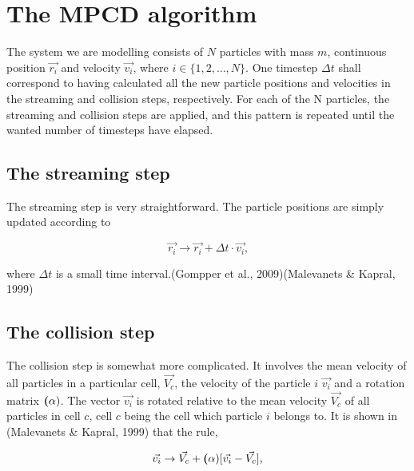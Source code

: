 \documentclass[
]{article}
\begin{document}
\hypertarget{the-mpcd-algorithm}{%
\section{The MPCD algorithm}\label{the-mpcd-algorithm}}

The system we are modelling consists of \(N\) particles with mass \(m\),
continuous position \(\vec{r_{i}}\) and velocity \(\vec{v_{i}}\), where
\(i \in \{1, 2, \dots, N\}\). One timestep \(\Delta t\) shall correspond
to having calculated all the new particle positions and velocities in
the streaming and collision steps, respectively. For each of the N
particles, the streaming and collision steps are applied, and this
pattern is repeated until the wanted number of timesteps have elapsed.

\hypertarget{the-streaming-step}{%
\subsection{The streaming step}\label{the-streaming-step}}

The streaming step is very straightforward. The particle positions are
simply updated according to

\begin{equation}
\vec{r_{i}} \rightarrow \vec{r_{i}} + \Delta t \cdot \vec{v_{i}}\textrm{,}
\end{equation}

where \(\Delta t\) is a small time interval.(Gompper et al.,
2009)(Malevanets \& Kapral, 1999)

\hypertarget{the-collision-step}{%
\subsection{The collision step}\label{the-collision-step}}

The collision step is somewhat more complicated. It involves the mean
velocity of all particles in a particular cell, \(\vec{V_c}\), the
velocity of the particle \(i\) \(\vec{v_i}\) and a rotation matrix
\(\textbf(\alpha)\). The vector \(\vec{v_i}\) is rotated relative to the
mean velocity \(\vec{V_c}\) of all particles in cell \(c\), cell \(c\)
being the cell which particle \(i\) belongs to. It is shown in
(Malevanets \& Kapral, 1999) that the rule,

\begin{equation}
\vec{v_i} \rightarrow \vec{V_c} + \textbf(\alpha) [\vec{v_i} - \vec{V_c}] \textrm{,}
\end{equation}
\end{document}
